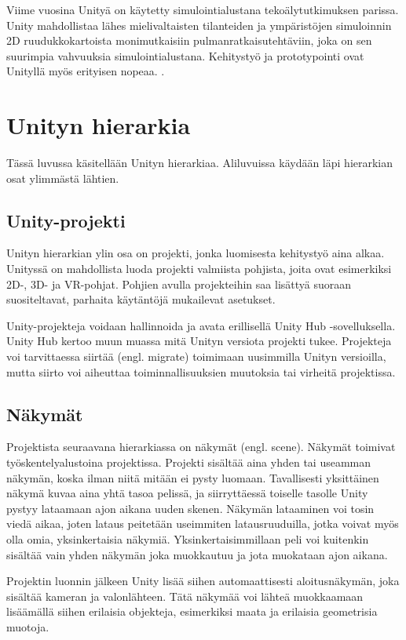 \documentclass[utf8]{gradu3}
\begin{document}
Viime vuosina Unityä on käytetty simulointialustana tekoälytutkimuksen parissa. Unity mahdollistaa lähes mielivaltaisten tilanteiden ja ympäristöjen simuloinnin 2D ruudukkokartoista monimutkaisiin pulmanratkaisutehtäviin, joka on sen suurimpia vahvuuksia simulointialustana. Kehitystyö ja prototypointi ovat Unityllä myös erityisen nopeaa. \parencite{juliani2018unity}.

\section{Unityn hierarkia}

Tässä luvussa käsitellään Unityn hierarkiaa. Aliluvuissa käydään läpi hierarkian osat ylimmästä lähtien.

\subsection{Unity-projekti}

Unityn hierarkian ylin osa on projekti, jonka luomisesta kehitystyö aina alkaa. Unityssä on mahdollista luoda projekti valmiista pohjista, joita ovat esimerkiksi 2D-, 3D- ja VR-pohjat. Pohjien avulla projekteihin saa lisättyä suoraan suositeltavat, parhaita käytäntöjä mukailevat asetukset.

Unity-projekteja voidaan hallinnoida ja avata erillisellä Unity Hub -sovelluksella. Unity Hub kertoo muun muassa mitä Unityn versiota projekti tukee. Projekteja voi tarvittaessa siirtää (engl. migrate) toimimaan uusimmilla Unityn versioilla, mutta siirto voi aiheuttaa toiminnallisuuksien muutoksia tai virheitä projektissa.

\subsection{Näkymät}

Projektista seuraavana hierarkiassa on näkymät (engl. scene). Näkymät toimivat työskentelyalustoina projektissa. Projekti sisältää aina yhden tai useamman näkymän, koska ilman niitä mitään ei pysty luomaan. Tavallisesti yksittäinen näkymä kuvaa aina yhtä tasoa pelissä, ja siirryttäessä toiselle tasolle Unity pystyy lataamaan ajon aikana uuden skenen. Näkymän lataaminen voi tosin viedä aikaa, joten lataus peitetään useimmiten latausruuduilla, jotka voivat myös olla omia, yksinkertaisia näkymiä. Yksinkertaisimmillaan peli voi kuitenkin sisältää vain yhden näkymän joka muokkautuu ja jota muokataan ajon aikana.

Projektin luonnin jälkeen Unity lisää siihen automaattisesti aloitusnäkymän, joka sisältää kameran ja valonlähteen. Tätä näkymää voi lähteä muokkaamaan lisäämällä siihen erilaisia objekteja, esimerkiksi maata ja erilaisia geometrisia muotoja.
\end{document}
